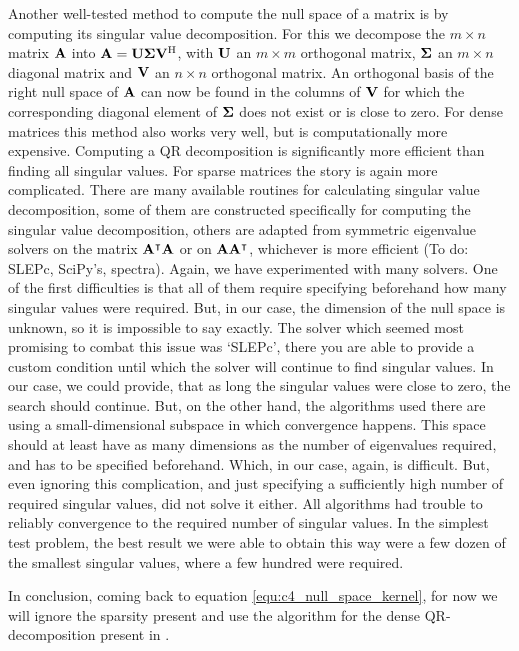 Another well-tested method to compute the null space of a matrix is by computing its singular value decomposition. For this we decompose the $m \times n$ matrix $\vb{A}$ into $\vb{A} = \vb{U}\vb{\Sigma}{\vb{V}}^{\text{H}}$, with $\vb{U}$ an $m \times m$ orthogonal matrix, $\vb{\Sigma}$ an $m \times n$ diagonal matrix and $\vb{V}$ an $n \times n$ orthogonal matrix. An orthogonal basis of the right null space of $\vb{A}$ can now be found in the columns of $\vb{V}$ for which the corresponding diagonal element of $\vb{\Sigma}$ does not exist or is close to zero. For dense matrices this method also works very well, but is computationally more expensive. Computing a QR decomposition is significantly more efficient than finding all singular values. For sparse matrices the story is again more complicated. There are many available routines for calculating singular value decomposition, some of them are constructed specifically for computing the singular value decomposition, others are adapted from symmetric eigenvalue solvers on the matrix ${\vb{A}}^\intercal\vb{A}$ or on $\vb{A}{\vb{A}}^\intercal$, whichever is more efficient ({\color{red}To do: SLEPc, SciPy's, spectra}). Again, we have experimented with many solvers. One of the first difficulties is that all of them require specifying beforehand how many singular values were required. But, in our case, the dimension of the null space is unknown, so it is impossible to say exactly. The solver which seemed most promising to combat this issue was `SLEPc', there you are able to provide a custom condition until which the solver will continue to find singular values. In our case, we could provide, that as long the singular values were close to zero, the search should continue. But, on the other hand, the algorithms used there are using a small-dimensional subspace in which convergence happens. This space should at least have as many dimensions as the number of eigenvalues required, and has to be specified beforehand. Which, in our case, again, is difficult. But, even ignoring this complication, and just specifying a sufficiently high number of required singular values, did not solve it either. All algorithms had trouble to reliably convergence to the required number of singular values. In the simplest test problem, the best result we were able to obtain this way were a few dozen of the smallest singular values, where a few hundred were required.

In conclusion, coming back to equation \eqref{equ:c4_null_space_kernel}, for now we will ignore the sparsity present and use the algorithm for the dense QR-decomposition present in \Eigen \cite{guennebaud_eigen_2010}.

